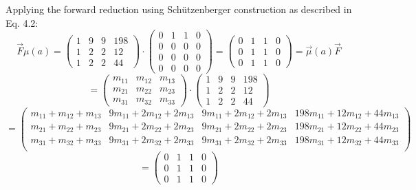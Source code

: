         Applying the forward reduction using Schützenberger construction as described in \autocite{Kiefer2013OnTC} Eq. 4.2:
        \[ \overrightarrow{F} \mu(a) = 
            \begin{pmatrix}
                1 & 9 & 9 & 198 \\
                1 & 2 & 2 & 12  \\
                1 & 2 & 2 & 44
            \end{pmatrix} \cdot \begin{pmatrix}
                    0 & 1 & 1 & 0 \\
                    0 & 0 & 0 & 0 \\
                    0 & 0 & 0 & 0 \\
                    0 & 0 & 0 & 0
            \end{pmatrix} = \begin{pmatrix}
                0 & 1 & 1 & 0 \\
                0 & 1 & 1 & 0 \\
                0 & 1 & 1 & 0
            \end{pmatrix}  = \overrightarrow{\mu}(a) \overrightarrow{F} 
        \] 
        \[=  \begin{pmatrix}
                m_{11} & m_{12} & m_{13} \\
                m_{21} & m_{22} & m_{23} \\
                m_{31} & m_{32} & m_{33} 
            \end{pmatrix} \cdot \begin{pmatrix}
                1 & 9 & 9 & 198 \\
                1 & 2 & 2 & 12  \\
                1 & 2 & 2 & 44
            \end{pmatrix} \]
            \[ =
             \begin{pmatrix}
                m_{11} + m_{12} + m_{13} & 9m_{11}+2m_{12}+2m_{13} & 9m_{11}+2m_{12}+2m_{13} & 198m_{11}+12m_{12}+44m_{13} \\
                m_{21} + m_{22} + m_{23} & 9m_{21}+2m_{22}+2m_{23} & 9m_{21}+2m_{22}+2m_{23} & 198m_{21}+12m_{22}+44m_{23}  \\
                m_{31} + m_{32} + m_{33} & 9m_{31}+2m_{32}+2m_{33} & 9m_{31}+2m_{32}+2m_{33} & 198m_{31}+12m_{32}+44m_{33}  \\
            \end{pmatrix} 
        \]
        \[ = 
            \begin{pmatrix}
                0 & 1 & 1 & 0 \\
                0 & 1 & 1 & 0 \\
                0 & 1 & 1 & 0
            \end{pmatrix}
        \]
